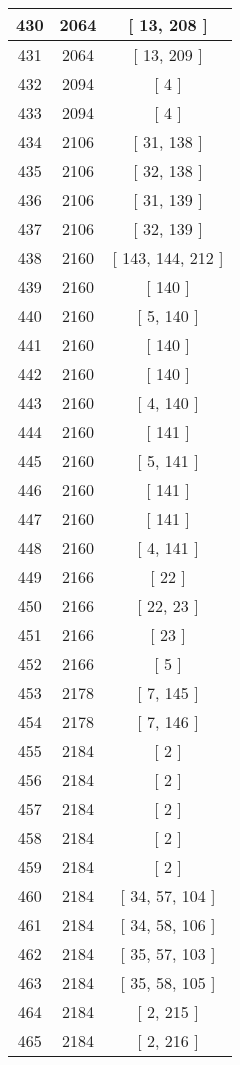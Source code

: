 \begin{center}
\begin{longtable}[H]{|| c c c ||}
\hline
430 & 2064 & [ 13, 208 ] \\ 
\hline
431 & 2064 & [ 13, 209 ] \\ 
\hline
432 & 2094 & [ 4 ] \\ 
\hline
433 & 2094 & [ 4 ] \\ 
\hline
434 & 2106 & [ 31, 138 ] \\ 
\hline
435 & 2106 & [ 32, 138 ] \\ 
\hline
436 & 2106 & [ 31, 139 ] \\ 
\hline
437 & 2106 & [ 32, 139 ] \\ 
\hline
438 & 2160 & [ 143, 144, 212 ] \\ 
\hline
439 & 2160 & [ 140 ] \\ 
\hline
440 & 2160 & [ 5, 140 ] \\ 
\hline
441 & 2160 & [ 140 ] \\ 
\hline
442 & 2160 & [ 140 ] \\ 
\hline
443 & 2160 & [ 4, 140 ] \\ 
\hline
444 & 2160 & [ 141 ] \\ 
\hline
445 & 2160 & [ 5, 141 ] \\ 
\hline
446 & 2160 & [ 141 ] \\ 
\hline
447 & 2160 & [ 141 ] \\ 
\hline
448 & 2160 & [ 4, 141 ] \\ 
\hline
449 & 2166 & [ 22 ] \\ 
\hline
450 & 2166 & [ 22, 23 ] \\ 
\hline
451 & 2166 & [ 23 ] \\ 
\hline
452 & 2166 & [ 5 ] \\ 
\hline
453 & 2178 & [ 7, 145 ] \\ 
\hline
454 & 2178 & [ 7, 146 ] \\ 
\hline
455 & 2184 & [ 2 ] \\ 
\hline
456 & 2184 & [ 2 ] \\ 
\hline
457 & 2184 & [ 2 ] \\ 
\hline
458 & 2184 & [ 2 ] \\ 
\hline
459 & 2184 & [ 2 ] \\ 
\hline
460 & 2184 & [ 34, 57, 104 ] \\ 
\hline
461 & 2184 & [ 34, 58, 106 ] \\ 
\hline
462 & 2184 & [ 35, 57, 103 ] \\ 
\hline
463 & 2184 & [ 35, 58, 105 ] \\ 
\hline
464 & 2184 & [ 2, 215 ] \\ 
\hline
465 & 2184 & [ 2, 216 ] \\ 

\end{longtable}
\end{center}
